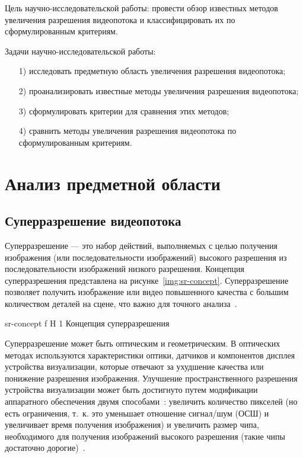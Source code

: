 \documentclass{bmstu}
\begin{document}
Цель научно-исследовательской работы: провести обзор известных методов увеличения разрешения видеопотока и классифицировать их по сформулированным критериям.

Задачи научно-исследовательской работы:
\begin{enumerate}
\item[1)] исследовать предметную область увеличения разрешения видеопотока;
\item[2)] проанализировать известные методы увеличения разрешения видеопотока;
\item[3)] сформулировать критерии для сравнения этих методов;
\item[4)] сравнить методы увеличения разрешения видеопотока по сформулированным критериям.
\end{enumerate}

\chapter{Анализ предметной области}

\section{Суперразрешение видеопотока}

Суперразрешение --- это набор действий, выполняемых с целью получения изображения (или последовательности изображений) высокого разрешения из последовательности изображений низкого разрешения. 
Концепция суперразрешения представлена на рисунке~\ref{img:sr-concept}. 
Суперразрешение позволяет получить изображение или видео повышенного качества с большим количеством деталей на сцене, что важно для точного анализа~\cite{Daithankar2021}. 

    {sr-concept}
    {f}
    {H}
    {1\textwidth}
    {Концепция суперразрешения~\cite{Daithankar2021}}

Суперразрешение может быть оптическим и геометрическим. 
В оптических методах используются характеристики оптики, датчиков и компонентов дисплея устройства визуализации, которые отвечают за ухудшение качества или понижение разрешения изображения. 
Улучшение пространственного разрешения устройства визуализации может быть достигнуто путем модификации аппаратного обеспечения двумя способами~\cite{Daithankar2021}: увеличить количество пикселей (но есть ограничения, т.~к. это уменьшает отношение сигнал/шум (ОСШ) и увеличивает время получения изображения) и увеличить размер чипа, необходимого для получения изображений высокого разрешения (такие чипы достаточно дорогие)~\cite{Park2003}.
\end{document}
